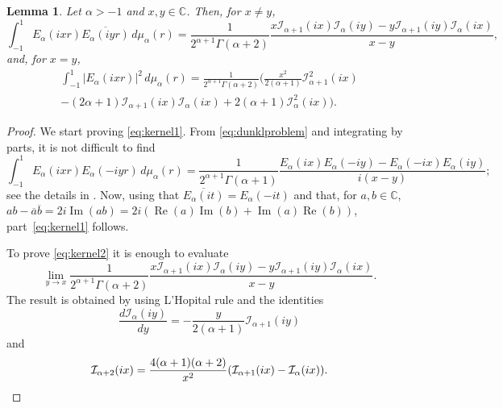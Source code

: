 \documentclass[11pt]{amsart}
\theoremstyle{plain}
\newtheorem{Lem}{Lemma}
\renewcommand{\Im}{\operatorname{Im}}
\renewcommand{\Re}{\operatorname{Re}}
\begin{document}
\begin{Lem}
\label{lem:kernel}
Let $\alpha > -1$ and $x,y\in \mathbb{C}$. Then, for $x \not=  y$,
\begin{equation}
\label{eq:kernel1}
  \int_{-1}^1 E_{\alpha}(ixr)\overline{E_{\alpha}(iyr)}\, d\mu_{\alpha}(r)
 = \frac{1}{2^{\alpha+1}\Gamma(\alpha+2)}
   \frac{x\mathcal{I}_{\alpha+1}(ix)\mathcal{I}_{\alpha}(iy)
     - y\mathcal{I}_{\alpha+1}(iy)\mathcal{I}_{\alpha}(ix)}{x-y},
\end{equation}
and, for $x = y$,
\begin{multline}
\label{eq:kernel2}
  \int_{-1}^1 |E_{\alpha}(ixr)|^2\, d\mu_{\alpha}(r)
  = \frac{1}{2^{\alpha+1}\Gamma(\alpha+2)}
  \Big( \frac{x^2}{2(\alpha+1)}\mathcal{I}_{\alpha+1}^2(ix) \\
  - (2\alpha+1)\mathcal{I}_{\alpha+1}(ix)\mathcal{I}_{\alpha}(ix)
  + 2(\alpha+1)\mathcal{I}_{\alpha}^2(ix) \Big).
\end{multline}
\end{Lem}

\begin{proof}
We start proving \eqref{eq:kernel1}.
From \eqref{eq:dunklproblem} and integrating by parts, it is not difficult to find
\[
  \int_{-1}^1 E_{\alpha}(ixr)E_{\alpha}(-iyr)\, d\mu_{\alpha}(r)
  = \frac{1}{2^{\alpha+1}\Gamma(\alpha+1)}
  \frac{E_{\alpha}(ix)E_{\alpha}(-iy) - E_{\alpha}(-ix)E_{\alpha}(iy)}{i(x-y)};
\]
see the details in \cite[Lemma~1]{BCV}.
Now, using that $\overline{E_{\alpha}(it)} = E_{\alpha}(-it)$
and that, for $a,b\in\mathbb{C}$,
$ab-\overline{a}\overline{b} = 2i\Im(ab) = 2i(\Re(a)\Im(b)+\Im(a)\Re(b))$,
part~\eqref{eq:kernel1} follows.
 
To prove \eqref{eq:kernel2} it is enough to evaluate
\[
  \lim_{y\to x}\frac{1}{2^{\alpha+1}\Gamma(\alpha+2)}
  \frac{x\mathcal{I}_{\alpha+1}(ix)\mathcal{I}_{\alpha}(iy)
  - y\mathcal{I}_{\alpha+1}(iy)\mathcal{I}_{\alpha}(ix)}{x-y}.
\]
The result is obtained by using L'Hopital rule and the identities
\[
  \frac{d\mathcal{I}_{\alpha}(iy)}{dy}
  = -\frac{y}{2(\alpha+1)}\mathcal{I}_{\alpha+1}(iy)
\]
and
\[
  \mathcal{I}_{\alpha+2}(ix) = \frac{4(\alpha+1)(\alpha+2)}{x^2}
    (\mathcal{I}_{\alpha+1}(ix)-\mathcal{I}_{\alpha}(ix)).
  \qedhere
\]
\end{proof}
\end{document}
